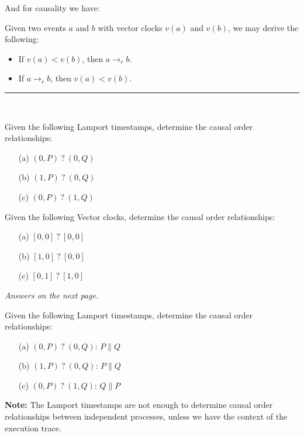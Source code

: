 \noindent
And for causality we have:
\begin{theo}

    Given two events $a$ and $b$ with vector clocks $v(a)$ and $v(b)$, we may derive the following:
    \begin{itemize}
        \item If $v(a) < v(b)$, then $a \rightarrow_r b$.
        \item If $a \rightarrow_r b$, then $v(a) < v(b)$.
    \end{itemize}
\end{theo}

\noindent
\rule{\textwidth}{0.4pt}\\

\begin{Exercise} Given the following Lamport timestamps, determine the causal order relationships:

    \begin{itemize}
        \item[(a)] $(0,P)\ ?\ (0,Q)$
        \item[(b)] $(1,P)\ ?\ (0,Q)$
        \item[(c)] $(0,P)\ ?\ (1,Q)$
    \end{itemize}
\end{Exercise}

\begin{Exercise} Given the following Vector clocks, determine the causal order relationships:

    \begin{itemize}
        \item[(a)] $[0,0]\ ?\ [0,0]$
        \item[(b)] $[1,0]\ ?\ [0,0]$
        \item[(c)] $[0,1]\ ?\ [1,0]$
    \end{itemize}
\end{Exercise}

\hfill \textit{Answers on the next page.}\hfill \null

\newpage 

\begin{Answer} Given the following Lamport timestamps, determine the causal order relationships:

    \begin{itemize}
        \item[(a)] $(0,P)\ ?\ (0,Q)$: $P \parallel Q$
        \item[(b)] $(1,P)\ ?\ (0,Q)$: $P \parallel Q$
        \item[(c)] $(0,P)\ ?\ (1,Q)$: $Q \parallel P$
    \end{itemize}

    \noindent
    \textbf{Note:} The Lamport timestamps are not enough to determine causal order relationships between independent processes, unless 
    we have the context of the execution trace.\\
\end{Answer}

